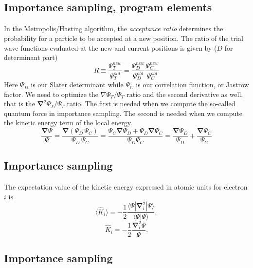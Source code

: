 \documentclass[%
twoside,                 %
final,                   %
10pt]{article}
\begin{document}
\subsection*{Importance sampling, program elements}

\paragraph{}
In the Metropolis/Hasting algorithm, the \emph{acceptance ratio} determines the probability for a particle  to be accepted at a new position. The ratio of the trial wave functions evaluated at the new and current positions is given by ($D$ for determinant part)
\[
R \equiv \frac{\Psi_{T}^{new}}{\Psi_{T}^{old}} = 
\frac{\Psi_{D}^{new}}{\Psi_{D}^{old}}\frac{\Psi_{C}^{new}}{\Psi_{C}^{old}}
\]
Here $\Psi_{D}$ is our Slater determinant while $\Psi_{C}$ is our correlation function, or Jastrow factor. 
We need to optimize the $\nabla \Psi_T / \Psi_T$ ratio and the second derivative as well, that is
the $\mathbf{\nabla}^2 \Psi_T/\Psi_T$ ratio. The first is needed when we compute the so-called quantum force in importance sampling.
The second is needed when we compute the kinetic energy term of the local energy.
\[
\frac{\mathbf{\mathbf{\nabla}}  \Psi}{\Psi}  = \frac{\mathbf{\nabla}  (\Psi_{D} \, \Psi_{C})}{\Psi_{D} \, \Psi_{C}}  =  \frac{ \Psi_C \mathbf{\nabla}  \Psi_{D} + \Psi_{D} \mathbf{\nabla}  \Psi_{C}}{\Psi_{D} \Psi_{C}} = \frac{\mathbf{\nabla}  \Psi_{D}}{\Psi_{D}} + \frac{\mathbf{\nabla}   \Psi_C}{ \Psi_C}
\]



\subsection*{Importance sampling}

\paragraph{}
The expectation value of the kinetic energy expressed in atomic units for electron $i$ is 
\[
 \langle \hat{K}_i \rangle = -\frac{1}{2}\frac{\langle\Psi|\mathbf{\nabla}_{i}^2|\Psi \rangle}{\langle\Psi|\Psi \rangle},
\]
\[
\hat{K}_i = -\frac{1}{2}\frac{\mathbf{\nabla}_{i}^{2} \Psi}{\Psi}.
\]




\subsection*{Importance sampling}
\end{document}
